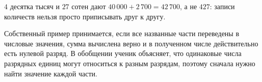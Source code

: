 \begin{teacherbox}
  \(4\) десятка тысяч и \(27\) сотен дают
  \(40\,000+2\,700=42\,700\), а не \(427\): записи количеств нельзя просто
  приписывать друг к другу.

  Собственный пример принимается, если все названные части переведены в
  числовые значения, сумма вычислена верно и в полученном числе действительно
  есть нулевой разряд. В обобщении ученик объясняет, что одинаковые числа
  разрядных единиц могут относиться к разным разрядам, поэтому сначала нужно
  найти значение каждой части.
\end{teacherbox}
